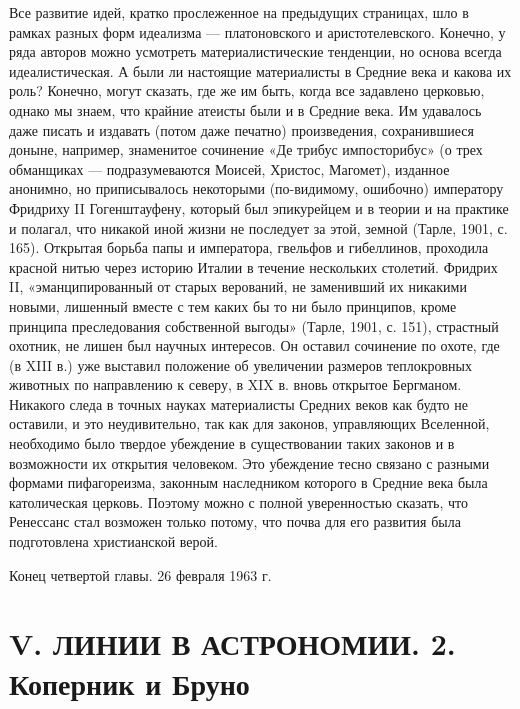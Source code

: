Все развитие идей, кратко прослеженное  на предыдущих страницах, шло в
рамках  разных форм  идеализма ---  платоновского и  аристотелевского.
Конечно, у ряда авторов  можно усмотреть материалистические тенденции,
но основа всегда  идеалистическая. А были ли  настоящие материалисты в
Средние  века и  какова их  роль? Конечно,  могут сказать,  где же  им
быть,  когда все  задавлено  церковью, однако  мы  знаем, что  крайние
атеисты были  и в Средние  века. Им  удавалось даже писать  и издавать
(потом  даже печатно)  произведения,  сохранившиеся доныне,  например,
знаменитое сочинение  «Де трибус импосторибус» (о  трех обманщиках ---
подразумеваются  Моисей,  Христос,  Магомет),  изданное  анонимно,  но
приписывалось некоторыми  (по-видимому, ошибочно)  императору Фридриху
II Гогенштауфену,  который был  эпикурейцем и в  теории и  на практике
и  полагал,  что никакой  иной  жизни  не  последует за  этой,  земной
(Тарле, 1901,  с. 165).  Открытая борьба  папы и  императора, гвельфов
и  гибеллинов,   проходила  красной  нитью  через   историю  Италии  в
течение нескольких  столетий. Фридрих II, «эманципированный  от старых
верований,  не  заменивший  их  никакими  новыми,  лишенный  вместе  с
тем  каких  бы то  ни  было  принципов, кроме  принципа  преследования
собственной выгоды» (Тарле, 1901, с. 151), страстный охотник, не лишен
был научных интересов. Он оставил сочинение  по охоте, где (в XIII в.)
уже выставил положение об увеличении размеров теплокровных животных по
направлению  к северу,  в XIX  в. вновь  открытое Бергманом.  Никакого
следа  в  точных  науках  материалисты  Средних  веков  как  будто  не
оставили,  и  это  неудивительно,  так как  для  законов,  управляющих
Вселенной,  необходимо было  твердое убеждение  в существовании  таких
законов и  в возможности  их открытия  человеком. Это  убеждение тесно
связано с разными формами  пифагореизма, законным наследником которого
в  Средние века  была  католическая церковь.  Поэтому  можно с  полной
уверенностью сказать,  что Ренессанс стал возможен  только потому, что
почва для его развития была подготовлена христианской верой.

\begin{flushright}  Конец   четвертой  главы.   26  февраля   1963  г.
\end{flushright}

\clearpage

\section{V. ЛИНИИ В АСТРОНОМИИ. 2. Коперник и Бруно}

